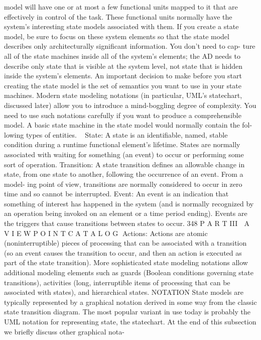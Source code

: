 model will have one or at most a few functional units mapped to it that are
effectively in control of the task. These functional units normally have the
system’s interesting state models associated with them. If you create a state
model, be sure to focus on these system elements so that the state model
describes only architecturally significant information. You don’t need to cap-
ture all of the state machines inside all of the system’s elements; the AD
needs to describe only state that is visible at the system level, not state that is
hidden inside the system’s elements.
An important decision to make before you start creating the state model is
the set of semantics you want to use in your state machines. Modern state
modeling notations (in particular, UML’s statechart, discussed later) allow
you to introduce a mind-boggling degree of complexity. You need to use such
notations carefully if you want to produce a comprehensible model.
A basic state machine in the state model would normally contain the fol-
lowing types of entities.
State: A state is an identifiable, named, stable condition during a runtime
functional element’s lifetime. States are normally associated with waiting
for something (an event) to occur or performing some sort of operation.
Transition: A state transition defines an allowable change in state, from
one state to another, following the occurrence of an event. From a model-
ing point of view, transitions are normally considered to occur in zero
time and so cannot be interrupted.
Event: An event is an indication that something of interest has happened
in the system (and is normally recognized by an operation being invoked
on an element or a time period ending). Events are the triggers that
cause transitions between states to occur.
348
 P A R T III  A V I E W P O I N T C A T A L O G
Actions: Actions are atomic (noninterruptible) pieces of processing that
can be associated with a transition (so an event causes the transition to
occur, and then an action is executed as part of the state transition).
More sophisticated state modeling notations allow additional modeling
elements such as guards (Boolean conditions governing state transitions),
activities (long, interruptible items of processing that can be associated with
states), and hierarchical states.
NOTATION State models are typically represented by a graphical notation
derived in some way from the classic state transition diagram. The most popular
variant in use today is probably the UML notation for representing state, the
statechart. At the end of this subsection we briefly discuss other graphical nota-
